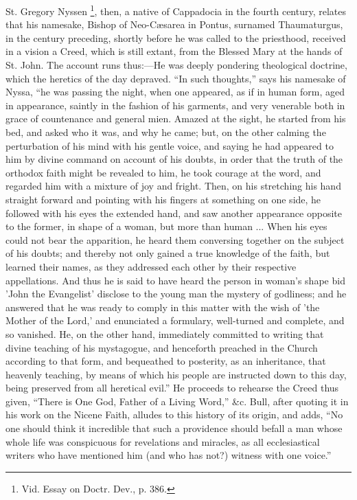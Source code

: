 St. Gregory Nyssen \footnote{Vid.
Essay on Doctr. Dev., p. 386.},
then, a native of Cappadocia in the fourth century, relates that his
namesake, Bishop of Neo-Cæsarea in Pontus, surnamed Thaumaturgus, in
the century preceding, shortly before he was called to the priesthood,
received in a vision a Creed, which is still extant, from the Blessed
Mary at the hands of St. John. The account runs thus:—He was deeply
pondering theological doctrine, which the heretics of the day depraved.
``In such thoughts,'' says his namesake of Nyssa, ``he was
passing the night, when one appeared, as if in human form, aged in
appearance, saintly in the fashion of his garments, and very venerable
both in grace of countenance and general mien. Amazed at the sight, he
started from his bed, and asked who it was, and why he came; but, on the
other calming the perturbation of his mind with his gentle voice, and
saying he had appeared to him by divine command on account of his
doubts, in order that the truth of the orthodox faith might be revealed
to him, he took courage at the word, and regarded him with a mixture of
joy and fright. Then, on his stretching his hand straight forward and
pointing with his fingers at something on one side, he followed with his
eyes the extended hand, and saw another appearance opposite to the
former, in shape of a woman, but more than human ... When his eyes could
not bear the apparition, he heard them conversing together on the
subject of his doubts; and thereby not only gained a true knowledge
of the faith, but learned their names, as they addressed each other by
their respective appellations. And thus he is said to have heard the
person in woman's shape bid 'John the Evangelist' disclose to the young
man the mystery of godliness; and he answered that he was ready to
comply in this matter with the wish of 'the Mother of the Lord,' and
enunciated a formulary, well-turned and complete, and so vanished. He,
on the other hand, immediately committed to writing that divine teaching
of his mystagogue, and henceforth preached in the Church according to
that form, and bequeathed to posterity, as an inheritance, that heavenly
teaching, by means of which his people are instructed down to this day,
being preserved from all heretical evil.'' He proceeds to rehearse
the Creed thus given, ``There is One God, Father of a Living
Word,'' \&c. Bull, after quoting it in his work on the Nicene
Faith, alludes to this history of its origin, and adds, ``No one
should think it incredible that such a providence should befall a man
whose whole life was conspicuous for revelations and miracles, as all
ecclesiastical writers who have mentioned him (and who has not?) witness
with one voice.''

